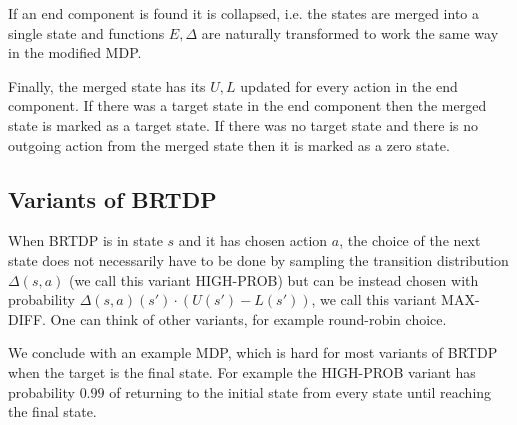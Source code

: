 If an end component is found it is collapsed, i.e. the states are merged into a
single state and functions $E, \Delta$ are naturally transformed to work
the same way in the modified MDP.

Finally, the merged state has its $U, L$ updated for every action in the
end component. If there was a target state in the end component then the
merged state is marked as a target state. If there was no target state and
there is no outgoing action from the merged state then it is marked as a
zero state.

\subsection*{Variants of BRTDP}
When BRTDP is in state $s$ and it has chosen action $a$,
the choice of the next state does not necessarily have to be done by
sampling the transition distribution $\Delta(s,a)$ (we call this variant
HIGH-PROB) but can be instead chosen with probability
$\Delta(s,a)(s') \cdot (U(s') - L(s'))$, we call this variant MAX-DIFF.
One can think of other variants, for example round-robin choice.

\begin{example}
\label{brtdp_adversary}
We conclude with an example MDP, which is hard for most variants of
BRTDP when the target is the final state.
For example the HIGH-PROB variant has probability $0.99$ of returning to
the initial state from every state until reaching the final state.

\begin{center}
\end{center}
\end{example}
